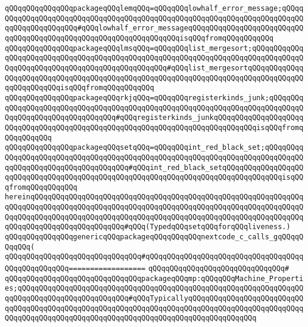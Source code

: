 \verb|qQQqqQQqqQQqqQQqpackageqQQqlemqQQq=qQQqqQQqlowhalf_error_message;qQQqqQQqqQQqqQQqqQQqqQQqqQQqqQQqqQQqqQQqqQQqqQQqqQQqqQQqqQQqqQQqqQQqqQQqqQQqqQQqqQQqqQQqqQQq#qQQqlowhalf_error_messageqQQqqQQqqQQqqQQqqQQqqQQqqQQqqQQqqQQqqQQqqQQqqQQqqQQqqQQqqQQqqQQqqQQqisqQQqfromqQQqqQQqqQQq|\newline
\verb|qQQqqQQqqQQqqQQqpackageqQQqlmsqQQq=qQQqqQQqlist_mergesort;qQQqqQQqqQQqqQQqqQQqqQQqqQQqqQQqqQQqqQQqqQQqqQQqqQQqqQQqqQQqqQQqqQQqqQQqqQQqqQQqqQQqqQQqqQQqqQQqqQQqqQQqqQQqqQQqqQQqqQQq#qQQqlist_mergesortqQQqqQQqqQQqqQQqqQQqqQQqqQQqqQQqqQQqqQQqqQQqqQQqqQQqqQQqqQQqqQQqqQQqqQQqqQQqqQQqqQQqqQQqqQQqqQQqisqQQqfromqQQqqQQqqQQq|\newline
\verb|qQQqqQQqqQQqqQQqpackageqQQqrkjqQQq=qQQqqQQqregisterkinds_junk;qQQqqQQqqQQqqQQqqQQqqQQqqQQqqQQqqQQqqQQqqQQqqQQqqQQqqQQqqQQqqQQqqQQqqQQqqQQqqQQqqQQqqQQqqQQqqQQqqQQqqQQq#qQQqregisterkinds_junkqQQqqQQqqQQqqQQqqQQqqQQqqQQqqQQqqQQqqQQqqQQqqQQqqQQqqQQqqQQqqQQqqQQqqQQqqQQqqQQqisqQQqfromqQQqqQQqqQQq|\newline
\verb|qQQqqQQqqQQqqQQqpackageqQQqsetqQQq=qQQqqQQqint_red_black_set;qQQqqQQqqQQqqQQqqQQqqQQqqQQqqQQqqQQqqQQqqQQqqQQqqQQqqQQqqQQqqQQqqQQqqQQqqQQqqQQqqQQqqQQqqQQqqQQqqQQqqQQqqQQq#qQQqint_red_black_setqQQqqQQqqQQqqQQqqQQqqQQqqQQqqQQqqQQqqQQqqQQqqQQqqQQqqQQqqQQqqQQqqQQqqQQqqQQqqQQqqQQqisqQQqfromqQQqqQQqqQQq|\newline
\verb|hereinqQQqqQQqqQQqqQQqqQQqqQQqqQQqqQQqqQQqqQQqqQQqqQQqqQQqqQQqqQQqqQQqqQQqqQQqqQQqqQQqqQQqqQQqqQQqqQQqqQQqqQQqqQQqqQQqqQQqqQQqqQQqqQQqqQQqqQQqqQQqqQQqqQQqqQQqqQQqqQQqqQQqqQQqqQQqqQQqqQQqqQQqqQQqqQQqqQQqqQQqqQQqqQQqqQQqqQQqqQQqqQQqqQQqqQQq#qQQq(TypedqQQqsetqQQqforqQQqliveness.)|\newline
\newline
\verb|qQQqqQQqqQQqqQQqgenericqQQqpackageqQQqqQQqqQQqnextcode_c_calls_gqQQqqQQqqQQq(|\newline
\verb|qQQqqQQqqQQqqQQqqQQqqQQqqQQqqQQq#qQQqqQQqqQQqqQQqqQQqqQQqqQQqqQQqqQQqqQQqqQQqqQQqqQQq==================|\newline
\verb|qQQqqQQqqQQqqQQqqQQqqQQqqQQqqQQq#|\newline
\verb|qQQqqQQqqQQqqQQqqQQqqQQqqQQqqQQqpackageqQQqmp:qQQqqQQqMachine_Properties;qQQqqQQqqQQqqQQqqQQqqQQqqQQqqQQqqQQqqQQqqQQqqQQqqQQqqQQqqQQqqQQqqQQqqQQqqQQqqQQqqQQqqQQqqQQqqQQq#qQQqTypicallyqQQqqQQqqQQqqQQqqQQqqQQqqQQqqQQqqQQqqQQqqQQqqQQqqQQqqQQqqQQqqQQqqQQqqQQqqQQqqQQqqQQqqQQqqQQqqQQqqQQqqQQqqQQqqQQqqQQqqQQqqQQqqQQqqQQqqQQqqQQqqQQqqQQqqQQqqQQq|\newline
